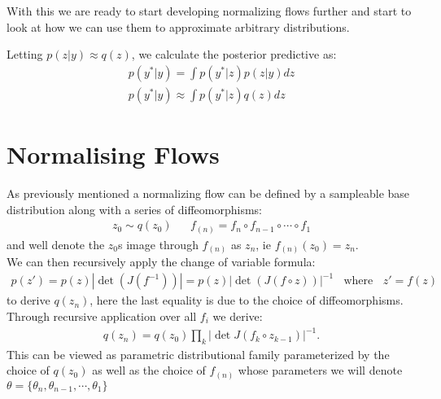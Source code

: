 With this we are ready to start developing normalizing flows further and start to look at how we can use them to approximate arbitrary distributions.

Letting $p(z|y) \approx q(z)$, we calculate the posterior predictive as:
\begin{align*}
    p(y^*|y) = \int p(y^*|z) p(z | y) dz  \\
    p(y^*|y) \approx \int p(y^*|z) q(z) dz
\end{align*}

\clearpage
\section{Normalising Flows}\label{NF}
As previously mentioned a normalizing flow can be defined by a sampleable base distribution along with a series of diffeomorphisms:
\begin{align*}
    z_0\sim q(z_0) && f_{(n)}=f_n\circ f_{n-1} \circ \cdots \circ f_1
\end{align*}
and well denote the $z_0$s image through $f_{(n)}$ as $z_n$, ie $f_{(n)}(z_0)=z_n$.\\
We can then recursively apply the change of variable formula:
\begin{align*}
    p(z')=p(z)|\det(J(f^{-1}))|=p(z)|\det(J(f\circ z))|^{-1} \ \ \ \  \text{where} \ \ \ \ z'=f(z)
\end{align*}
to derive $q(z_n)$, here the last equality is due to the choice of diffeomorphisms. Through recursive application over all $f_i$ we derive:
\begin{align*}
    q(z_n)=q(z_0)\prod_k|\det J(f_k \circ z_{k-1})|^{-1}.
\end{align*}
This can be viewed as parametric distributional family parameterized by the choice of $q(z_0)$ as well as the choice of $f_{(n)}$ whose parameters we will denote $\theta=\{\theta_n,\theta_{n-1},\cdots,\theta_1\}$
\cite{gelman2013bayesian}
